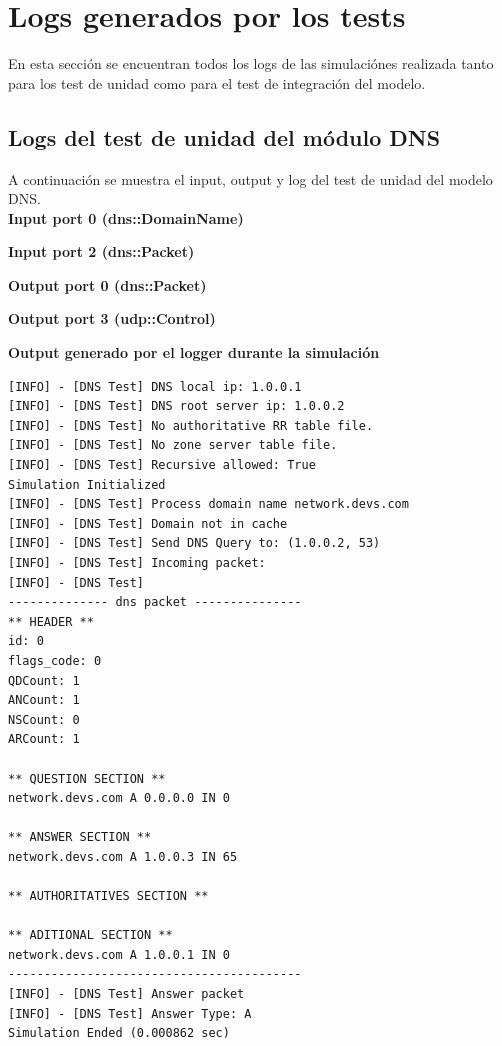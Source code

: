 \documentclass[10pt,a4paper]{article}
\begin{document}
\newpage




\newpage

\appendix
\section{Logs generados por los tests}
\label{appendix: logs}
En esta sección se encuentran todos los logs de las simulaciónes realizada tanto para los test de unidad como para el test de integración del modelo.

\subsection{Logs del test de unidad del módulo DNS}
\label{appendix: dns unit test}

A continuación se muestra el input, output y log del test de unidad del modelo DNS.\\

\textbf{Input port 0 (dns::DomainName)}


\textbf{Input port 2 (dns::Packet)}


\textbf{Output port 0 (dns::Packet)}


\textbf{Output port 3 (udp::Control)}


\textbf{Output generado por el logger durante la simulación}
\begin{lstlisting}
[INFO] - [DNS Test] DNS local ip: 1.0.0.1
[INFO] - [DNS Test] DNS root server ip: 1.0.0.2
[INFO] - [DNS Test] No authoritative RR table file.
[INFO] - [DNS Test] No zone server table file.
[INFO] - [DNS Test] Recursive allowed: True
Simulation Initialized
[INFO] - [DNS Test] Process domain name network.devs.com
[INFO] - [DNS Test] Domain not in cache
[INFO] - [DNS Test] Send DNS Query to: (1.0.0.2, 53)
[INFO] - [DNS Test] Incoming packet:
[INFO] - [DNS Test] 
-------------- dns packet ---------------
** HEADER ** 
id: 0
flags_code: 0
QDCount: 1
ANCount: 1
NSCount: 0
ARCount: 1

** QUESTION SECTION ** 
network.devs.com A 0.0.0.0 IN 0 

** ANSWER SECTION ** 
network.devs.com A 1.0.0.3 IN 65 

** AUTHORITATIVES SECTION ** 

** ADITIONAL SECTION ** 
network.devs.com A 1.0.0.1 IN 0 
-----------------------------------------
[INFO] - [DNS Test] Answer packet
[INFO] - [DNS Test] Answer Type: A
Simulation Ended (0.000862 sec)
\end{lstlisting}
\end{document}
